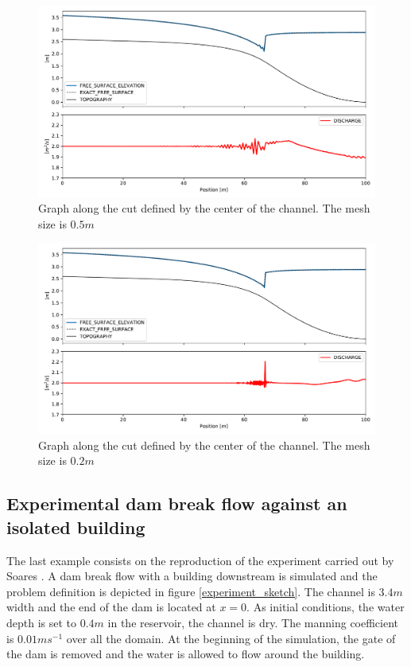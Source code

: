 \documentclass[a4paper,12pt]{article}
\begin{document}
\begin{figure}
    \centering
    \includegraphics[width=\textwidth]{img/jump/mesh_0.5.pdf}
    \caption{Graph along the cut defined by the center of the channel. The mesh size is $0.5m$}
    \label{mac_donald_shock_graph_5}
\end{figure}

\begin{figure}
    \centering
    \includegraphics[width=\textwidth]{img/jump/mesh_0.2.pdf}
    \caption{Graph along the cut defined by the center of the channel. The mesh size is $0.2m$}
    \label{mac_donald_shock_graph_2}
\end{figure}


\subsection{Experimental dam break flow against an isolated building}

The last example consists on the reproduction of the experiment carried out by Soares \cite{soares2007}.
A dam break flow with a building downstream is simulated and the problem definition is depicted in figure \ref{experiment_sketch}. The channel is $3.4m$ width and the end of the dam is located at $x=0$.
As initial conditions, the water depth is set to $0.4m$ in the reservoir, the channel is dry. The manning coefficient is $0.01ms^{-1}$ over all the domain.
At the beginning of the simulation, the gate of the dam is removed and the water is allowed to flow around the building.
\end{document}

